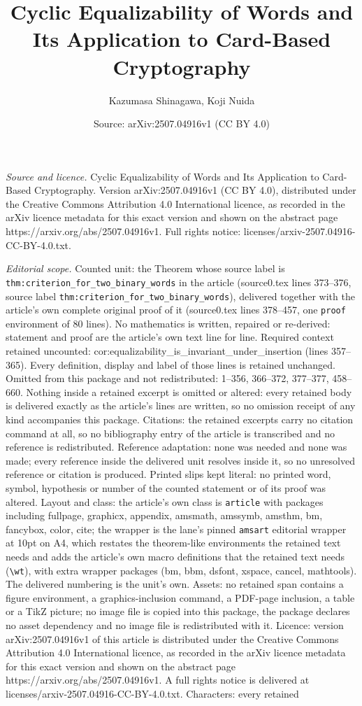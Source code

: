\documentclass[10pt,a4paper]{amsart}
\title[Cyclic Equalizability of Words and Its Application to Card-B]{Cyclic Equalizability of Words and Its Application to Card-Based Cryptography}
\author{Kazumasa Shinagawa, Koji Nuida}
\date{Source: arXiv:2507.04916v1 (CC BY 4.0)}
\begin{document}
\maketitle

\noindent\emph{Source and licence.} Cyclic Equalizability of Words and Its Application to Card-Based Cryptography. Version arXiv:2507.04916v1 (CC BY 4.0), distributed under the Creative Commons Attribution 4.0 International licence, as recorded in the arXiv licence metadata for this exact version and shown on the abstract page https://arxiv.org/abs/2507.04916v1. Full rights notice: licenses/arxiv-2507.04916-CC-BY-4.0.txt.\par\smallskip

\noindent\textit{Editorial scope.} Counted unit: the Theorem whose source label is \texttt{thm:criterion\_for\_two\_binary\_words} in the article (source0.tex lines 373--376, source label \texttt{thm:criterion\_for\_two\_binary\_words}), delivered together with the article's own complete original proof of it (source0.tex lines 378--457, one \texttt{proof} environment of 80 lines). No mathematics is written, repaired or re-derived: statement and proof are the article's own text line for line. Required context retained uncounted: cor:equalizability\_is\_invariant\_under\_insertion (lines 357--365). Every definition, display and label of those lines is retained unchanged. Omitted from this package and not redistributed: 1--356, 366--372, 377--377, 458--660. Nothing inside a retained excerpt is omitted or altered: every retained body is delivered exactly as the article's lines are written, so no omission receipt of any kind accompanies this package. Citations: the retained excerpts carry no citation command at all, so no bibliography entry of the article is transcribed and no reference is redistributed. Reference adaptation: none was needed and none was made; every reference inside the delivered unit resolves inside it, so no unresolved reference or citation is produced. Printed slips kept literal: no printed word, symbol, hypothesis or number of the counted statement or of its proof was altered. Layout and class: the article's own class is \texttt{article} with packages including fullpage, graphicx, appendix, amsmath, amssymb, amsthm, bm, fancybox, color, cite; the wrapper is the lane's pinned \texttt{amsart} editorial wrapper at 10pt on A4, which restates the theorem-like environments the retained text needs and adds the article's own macro definitions that the retained text needs (\texttt{\textbackslash wt}), with extra wrapper packages (bm, bbm, dsfont, xspace, cancel, mathtools). The delivered numbering is the unit's own. Assets: no retained span contains a figure environment, a graphics-inclusion command, a PDF-page inclusion, a table or a TikZ picture; no image file is copied into this package, the package declares no asset dependency and no image file is redistributed with it. Licence: version arXiv:2507.04916v1 of this article is distributed under the Creative Commons Attribution 4.0 International licence, as recorded in the arXiv licence metadata for this exact version and shown on the abstract page https://arxiv.org/abs/2507.04916v1. A full rights notice is delivered at licenses/arxiv-2507.04916-CC-BY-4.0.txt. Characters: every retained 
\end{document}
